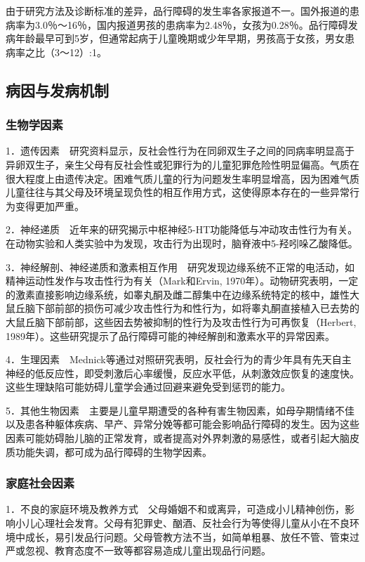 由于研究方法及诊断标准的差异，品行障碍的发生率各家报道不一。国外报道的患病率为3.0％～16％，国内报道男孩的患病率为2.48％，女孩为0.28％。品行障碍发病年龄最早可到5岁，但通常起病于儿童晚期或少年早期，男孩高于女孩，男女患病率之比（3～12）:1。

\subsection{病因与发病机制}

\subsubsection{生物学因素}

1．遗传因素　研究资料显示，反社会性行为在同卵双生子之间的同病率明显高于异卵双生子，亲生父母有反社会性或犯罪行为的儿童犯罪危险性明显偏高。气质在很大程度上由遗传决定。困难气质儿童的行为问题发生率明显增高，因为困难气质儿童往往与其父母及环境呈现负性的相互作用方式，这使得原本存在的一些异常行为变得更加严重。

2．神经递质　近年来的研究揭示中枢神经5-HT功能降低与冲动攻击性行为有关。在动物实验和人类实验中为发现，攻击行为出现时，脑脊液中5-羟吲哚乙酸降低。

3．神经解剖、神经递质和激素相互作用　研究发现边缘系统不正常的电活动，如精神运动性发作与攻击性行为有关（Mark和Ervin,
1970年）。动物研究表明，一定的激素直接影响边缘系统，如睾丸酮及雌二醇集中在边缘系统特定的核中，雄性大鼠丘脑下部前部的损伤可减少攻击性行为和性行为，如将睾丸酮直接植入已去势的大鼠丘脑下部前部，这些因去势被抑制的性行为及攻击性行为可再恢复（Herbert,
1989年）。这些研究提示了品行障碍可能的神经解剖和激素水平的异常因素。

4．生理因素　Mednick等通过对照研究表明，反社会行为的青少年具有先天自主神经的低反应性，即受刺激后心率缓慢，反应水平低，从刺激效应恢复的速度快。这些生理缺陷可能妨碍儿童学会通过回避来避免受到惩罚的能力。

5．其他生物因素　主要是儿童早期遭受的各种有害生物因素，如母孕期情绪不佳以及患各种躯体疾病、早产、异常分娩等都可能会影响品行障碍的发生。因为这些因素可能妨碍胎儿脑的正常发育，或者提高对外界刺激的易感性，或者引起大脑皮质功能失调，都可成为品行障碍的生物学因素。

\subsubsection{家庭社会因素}

1．不良的家庭环境及教养方式　父母婚姻不和或离异，可造成小儿精神创伤，影响小儿心理社会发育。父母有犯罪史、酗酒、反社会行为等使得儿童从小在不良环境中成长，易引发品行问题。父母管教方法不当，如简单粗暴、放任不管、管束过严或忽视、教育态度不一致等都容易造成儿童出现品行问题。

